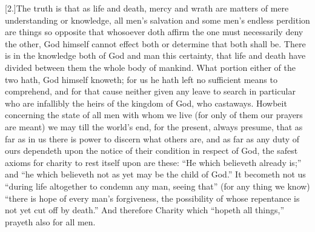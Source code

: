 [2.]The truth is that as life and death, mercy and wrath are matters of mere understanding or knowledge, all men’s salvation and some men’s endless perdition are things so opposite that whosoever doth affirm the one must necessarily deny the other, God himself cannot effect both or determine that both shall be. There is in the knowledge both of God and man this certainty, that life and death have divided between them the whole body of mankind. What portion either of the two hath, God himself knoweth; for us he hath left no sufficient means to comprehend, and for that cause neither given any leave to search in particular who are infallibly the heirs of the kingdom of God, who castaways. Howbeit concerning the state of all men with whom we live (for only of them our prayers are meant) we may till the world’s end, for the present, always presume, that as far as in us there is power to discern what others are, and as far as any duty of ours dependeth upon the notice of their condition in respect of God, the safest axioms for charity to rest itself upon are these: “He which believeth already is;” and “he which believeth not as yet may be the child of God.” It becometh not us “during life altogether to condemn any man, seeing that” (for any thing we know) “there is hope of every man’s forgiveness, the possibility of whose repentance is  not yet cut off by death.”
 And therefore Charity which “hopeth all things,” prayeth also for all men.

